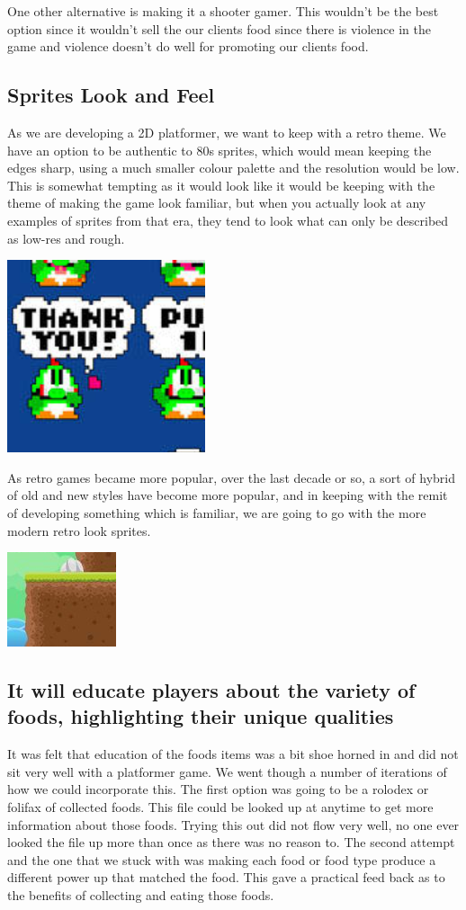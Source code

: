 \documentclass{article}
\begin{document}
One other alternative is making it a shooter gamer. This wouldn't be the best option since it wouldn't sell the our clients food since there is violence in the game and violence doesn't do well for promoting our clients food. 

\subsection{ Sprites Look and Feel }
As we are developing a 2D platformer, we want to keep with a retro theme. We have an option to be authentic to 80s sprites, which would mean keeping the edges sharp, using a much smaller colour palette and the resolution would be low.
This is somewhat tempting as it would look like it would be keeping with the theme of making the game look familiar, but when you actually look at any examples of sprites from that era, they tend to look what can only be described as low-res and rough.

\includegraphics[scale=0.5]{TraditionalSprite}

As retro games became more popular, over the last decade or so, a sort of hybrid of old and new styles have become more popular, and in keeping with the remit of developing something which is familiar, we are going to go with the more modern retro look sprites.

\includegraphics[scale=0.5]{SoftSprite}


\subsection{ It will educate players about the variety of foods, highlighting their unique qualities }
It was felt that education of the foods items was a bit shoe horned in and did not sit very well with a platformer game.
We went though a number of iterations of how we could incorporate this. The first option was going to be a rolodex or folifax of collected foods. This file could be looked up at anytime to get more information about those foods.
Trying this out did not flow very well, no one ever looked the file up more than once as there was no reason to.
The second attempt and the one that we stuck with was making each food or food type produce a different power up that matched the food. This gave a practical feed back as to the benefits of collecting and eating those foods.
\end{document}
